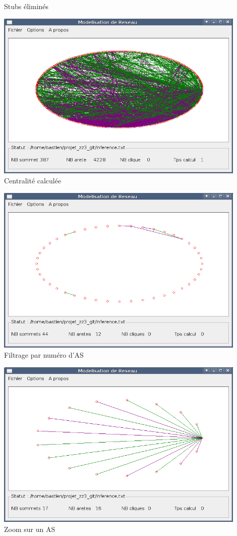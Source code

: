 {{\begin{center}
   Stubs \'elimin\'es
   \end{center}
}
{
   \begin{center}
   \includegraphics[width=0.9\textwidth]{ecran_graphe_centrality.png}\\
   Centralit\'e calcul\'ee
   \end{center}
}
{
   \begin{center}
   \includegraphics[width=0.9\textwidth]{ecran_graphe_filtre.png}\\
   Filtrage par num\'ero d'AS
   \end{center}
}
{
   \begin{center}
   \includegraphics[width=0.9\textwidth]{ecran_graphe_zoom.png}\\
   Zoom sur un AS
   \end{center}
}
}
